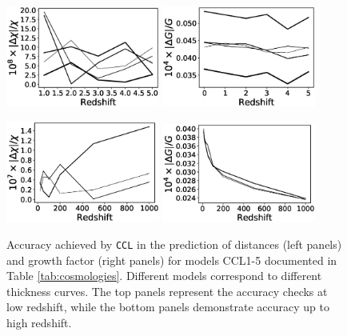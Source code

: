 \documentclass[\docopts]{\docclass}
\newcommand{\ccl}{{\tt CCL}\xspace}
\begin{document}
\begin{figure}
  \centering
  \includegraphics[width=0.45\textwidth]{distances.eps}
  \includegraphics[width=0.45\textwidth]{growth.eps}

  \includegraphics[width=0.45\textwidth]{distances_hiz.eps}
  \includegraphics[width=0.45\textwidth]{growth_hiz.eps}
  \caption{Accuracy achieved by \ccl in the prediction of distances (left panels) and growth factor (right panels) for models CCL1-5 documented in Table \ref{tab:cosmologies}. Different models correspond to different thickness curves. The top panels represent the accuracy checks at low redshift, while the bottom panels demonstrate accuracy up to high redshift.}
  \label{fig:distancegrow}
\end{figure}
\end{document}
